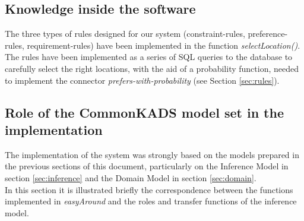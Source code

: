 \documentclass[11pt]{article} %
\begin{document}
\subsection{Knowledge inside the software}
The three types of rules designed for our system (constraint-rules, preference-rules, requirement-rules) have been implemented in the function \textit{selectLocation()}. The rules have been implemented as a series of SQL queries to the database to carefully select the right locations, with the aid of a probability function, needed to implement the connector \textit{prefers-with-probability} (see Section \ref{sec:rules}).


\subsection{Role of the CommonKADS model set in the implementation} \label{sec:common}
The implementation of the system was strongly based on the models prepared in the previous sections of this document, particularly on the Inference Model in section \ref{sec:inference} and the Domain Model in section \ref{sec:domain}.\\
In this section it is illustrated briefly the correspondence between the functions implemented in \textit{easyAround} and the roles and transfer functions of the inference model.
\end{document}
